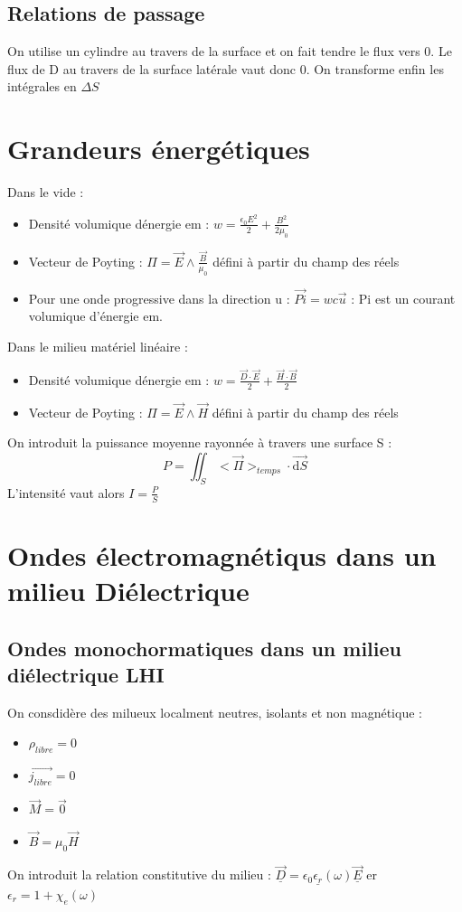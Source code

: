 \documentclass[french]{yLectureNote}
\renewcommand{\vec}{\overrightarrow}
\newcommand{\dd}{\mathrm{d}}
\begin{document}
\subsection{Relations de passage}
On utilise un cylindre au travers de la surface et on fait tendre le flux vers 0. 
Le flux de D au travers de la surface latérale vaut donc 0.
On transforme enfin les intégrales en $\Delta S$


\section{Grandeurs énergétiques}
Dans le vide :
\begin{itemize}
    \item Densité volumique dénergie em : $w = \frac{\epsilon_0 E^2}{2}+ \frac{B^2}{2\mu_0}$
    \item Vecteur de Poyting : $\Pi = \vec{E}\wedge \frac{\vec{B}}{\mu_0}$ défini à partir du champ des réels 
    \item Pour une onde progressive dans la direction u : $\vec{Pi} = wc\vec{u}$ : Pi est un courant volumique d'énergie em.
\end{itemize}

Dans le milieu matériel linéaire :
\begin{itemize}
    \item Densité volumique dénergie em : $w = \frac{\vec{D}\cdot \vec{E}}{2}+\frac{\vec{H}\cdot \vec{B}}{2}$
    \item Vecteur de Poyting : $\Pi = \vec{E}\wedge \vec{H}$ défini à partir du champ des réels 
\end{itemize}
On introduit la puissance moyenne rayonnée à travers une surface S :
$$P = \iint_S <\vec{\Pi}>_{temps}\cdot \vec{\dd S}$$
L'intensité vaut alors $ I = \frac{P}{S}$
\section{Ondes électromagnétiqus dans un milieu Diélectrique}
\subsection{Ondes monochormatiques dans un milieu diélectrique LHI}
On consdidère des milueux localment neutres, isolants et non magnétique :
\begin{itemize}
    \item $\rho_{libre} =0$
    \item $\vec{j_{libre}} = 0$
    \item $\vec{M} = \vec{0}$
    \item $\vec{B} = \mu_0\vec{H}$
\end{itemize}
On introduit la relation constitutive du milieu : $\vec{\underline{D}} = \epsilon_0\underline{\epsilon_r}(\omega)\vec{\underline{E}}$ er $\epsilon_r = 1+ \chi_e(\omega)$
\end{document}
